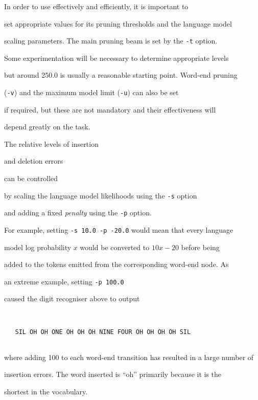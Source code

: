 In order to use  effectively and efficiently, it is important to 


set appropriate values for its pruning thresholds and the language model


scaling parameters.   The main pruning beam is set by the  \texttt{-t} option.


Some experimentation will be necessary to determine appropriate levels


but around 250.0 is usually a reasonable starting point.  Word-end pruning


(\texttt{-v}) and the maximum model limit (\texttt{-u}) can also be set


if required, but these are not mandatory and their effectiveness will


depend greatly on the task.





The relative levels of insertion 


and deletion errors


 can be controlled


by scaling the language model likelihoods using the \texttt{-s} option


and adding a fixed \textit{penalty}   using the \texttt{-p} option.


For example, setting \texttt{-s 10.0 -p -20.0} would mean that every language


model log probability $x$ would be converted to $10x - 20$ before being


added to the tokens emitted from the corresponding word-end node. As


an extreme example, setting \texttt{-p 100.0}


caused the digit recogniser above to output


\begin{verbatim}


   SIL OH OH ONE OH OH OH NINE FOUR OH OH OH OH SIL 


\end{verbatim}


where adding 100 to each word-end transition has resulted in a large number of


insertion errors.  The word inserted is ``oh'' primarily because it is the


shortest in the vocabulary. 


